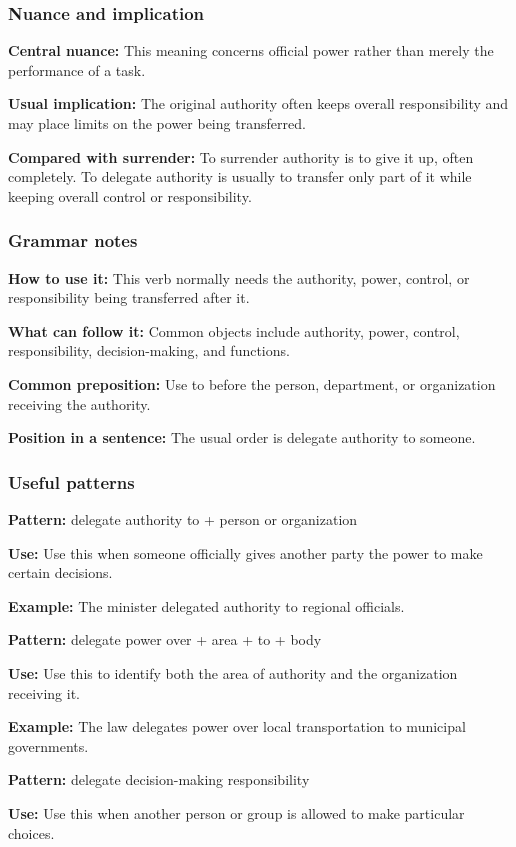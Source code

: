 \documentclass[11pt]{article}
\begin{document}
\subsubsection{Nuance and implication}
\textbf{Central nuance:} This meaning concerns official power rather than merely the performance of a task.

\textbf{Usual implication:} The original authority often keeps overall responsibility and may place limits on the power being transferred.

\textbf{Compared with surrender:} To surrender authority is to give it up, often completely. To delegate authority is usually to transfer only part of it while keeping overall control or responsibility.

\subsubsection{Grammar notes}
\textbf{How to use it:} This verb normally needs the authority, power, control, or responsibility being transferred after it.

\textbf{What can follow it:} Common objects include authority, power, control, responsibility, decision-making, and functions.

\textbf{Common preposition:} Use to before the person, department, or organization receiving the authority.

\textbf{Position in a sentence:} The usual order is delegate authority to someone.

\subsubsection{Useful patterns}
\textbf{Pattern:} delegate authority to + person or organization

\textbf{Use:} Use this when someone officially gives another party the power to make certain decisions.

\textbf{Example:} The minister delegated authority to regional officials.

\textbf{Pattern:} delegate power over + area + to + body

\textbf{Use:} Use this to identify both the area of authority and the organization receiving it.

\textbf{Example:} The law delegates power over local transportation to municipal governments.

\textbf{Pattern:} delegate decision-making responsibility

\textbf{Use:} Use this when another person or group is allowed to make particular choices.
\end{document}

